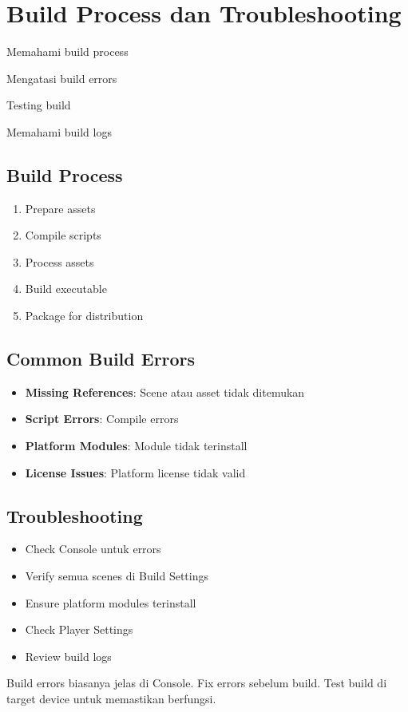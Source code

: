 
\section{Build Process dan Troubleshooting}

\begin{learningoutcomes}
\item Memahami build process
\item Mengatasi build errors
\item Testing build
\item Memahami build logs
\end{learningoutcomes}

\subsection{Build Process}

\begin{enumerate}
\item Prepare assets
\item Compile scripts
\item Process assets
\item Build executable
\item Package for distribution
\end{enumerate}

\subsection{Common Build Errors}

\begin{itemize}
\item \textbf{Missing References}: Scene atau asset tidak ditemukan
\item \textbf{Script Errors}: Compile errors
\item \textbf{Platform Modules}: Module tidak terinstall
\item \textbf{License Issues}: Platform license tidak valid
\end{itemize}

\subsection{Troubleshooting}

\begin{itemize}
\item Check Console untuk errors
\item Verify semua scenes di Build Settings
\item Ensure platform modules terinstall
\item Check Player Settings
\item Review build logs
\end{itemize}

\begin{catatan}
Build errors biasanya jelas di Console. Fix errors sebelum build. Test build di target device untuk memastikan berfungsi.
\end{catatan}
